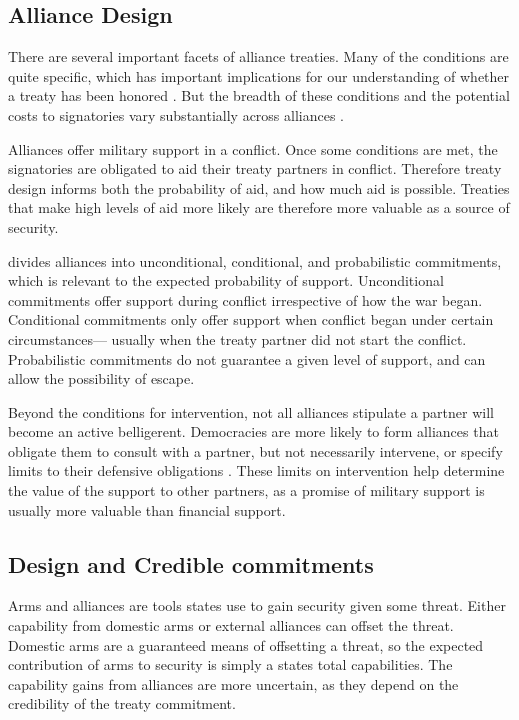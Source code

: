 \documentclass[12pt]{article}
\begin{document}
\subsection*{Alliance Design}

There are several important facets of alliance treaties. Many of the conditions are quite specific, which has important implications for our understanding of whether a treaty has been honored \citep{Leedsetal2000}. But the breadth of these conditions and the potential costs to signatories vary substantially across alliances \citep{BensonClinton2016}. 

Alliances offer military support in a conflict. Once some conditions are met, the signatories are obligated to aid their treaty partners in conflict. Therefore treaty design informs both the probability of aid, and how much aid is possible. Treaties that make high levels of aid more likely are therefore more valuable as a source of security. 

\citet{Benson2011, Benson2012} divides alliances into unconditional, conditional, and probabilistic commitments, which is relevant to the expected probability of support. Unconditional commitments offer support during conflict irrespective of how the war began. Conditional commitments only offer support when conflict began under certain circumstances--- usually when the treaty partner did not start the conflict. Probabilistic commitments do not guarantee a given level of support, and can allow the possibility of escape. 

Beyond the conditions for intervention, not all alliances stipulate a partner will become an active belligerent. Democracies are more likely to form alliances that obligate them to consult with a partner, but not necessarily intervene, or specify limits to their defensive obligations \citep{Chibaetal2015}. These limits on intervention help determine the value of the support to other partners, as a promise of military support is usually more valuable than financial support. 


\subsection*{Design and Credible commitments}

Arms and alliances are tools states use to gain security given some threat. Either capability from domestic arms or external alliances can offset the threat. Domestic arms are a guaranteed means of offsetting a threat, so the expected contribution of arms to security is simply a states total capabilities. The capability gains from alliances are more uncertain, as they depend on the credibility of the treaty commitment. 
\end{document}
